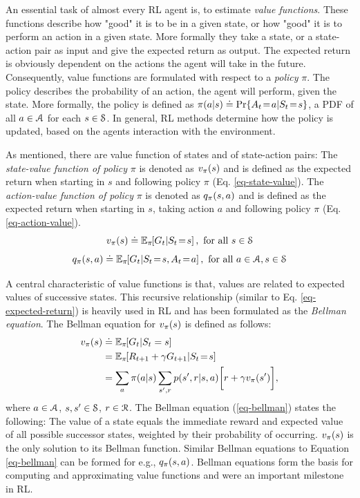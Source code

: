\documentclass[a4paper, twoside, 12pt]{article}
\begin{document}
An essential task of almost every RL agent is, to estimate \emph{value functions}.
These functions describe how "good" it is to be in a given state, or how "good"
it is to perform an action in a given state. More formally they take a state, or
a state-action pair as input and give the expected return as output. The
expected return is obviously dependent on the actions the agent will take in the
future. Consequently, value functions are formulated with respect to a \emph{policy}
\(\pi\). The policy describes the probability of an action, the agent will perform,
given the state. More formally, the policy is defined as
\(\pi(a|s)\defeq\Pr{A_t\!=\!a|S_t\!=\!s}\), a PDF of all \(a\in\A\) for each
\(s\in\S\). In general, RL methods determine how the policy is updated, based on
the agents interaction with the environment.

As mentioned, there are value function of states and of state-action pairs:
The \emph{state-value function of policy} \(\pi\) is denoted as \(\vpi(s)\) and is defined
as the expected return when starting in \(s\) and following policy \(\pi\) (Eq.
\ref{eq-state-value}). The \emph{action-value function of policy} \(\pi\) is denoted as
\(\qpi(s,a)\) and is defined as the expected return when starting in \(s\), taking
action \(a\) and following policy \(\pi\) (Eq. \ref{eq-action-value}).
\begin{equation} \label{eq-state-value}
    \vpi(s) \defeq \EE{\pi}{G_t|S_t\!=\!s}, \text{ for all } s\in\S
\end{equation}
\begin{equation} \label{eq-action-value}
    \qpi(s,a) \defeq \EE{\pi}{G_t|S_t\!=\!s, A_t\!=\!a}, \text{ for all } a\in\A, s\in\S
\end{equation}

A central characteristic of value functions is that, values are related to
expected values of successive states. This recursive relationship (similar to Eq.
\ref{eq-expected-return}) is heavily used in RL and has been formulated as the
\emph{Bellman equation}. The Bellman equation for \(\vpi(s)\) is defined as follows:
\begin{equation} \label{eq-bellman}
\begin{split}
    \vpi(s) &\defeq \EE{\pi}{G_t|S_t=s} \\
    &= \EE{\pi}{R_{t+1}+\gamma G_{t+1}|S_t\!=\!s} \\
    &= \sum_{a}{\pi(a|s)}\sum_{s',r}{p(s',r|s,a)}\bigg[r+\gamma\vpi(s')\bigg],
\end{split}
\end{equation}
where \(a\in\A\), \(s,s'\in\S\), \(r\in\R\).
The Bellman equation (\ref{eq-bellman}) states the following: The value of a state
equals the immediate reward and expected value of all possible successor states,
weighted by their probability of occurring. \(\vpi(s)\) is the only solution to its
Bellman function. Similar Bellman equations to Equation \ref{eq-bellman} can be
formed for e.g., \(\qpi(s,a)\). Bellman equations form the basis for computing and
approximating value functions and were an important milestone in RL.
\end{document}
